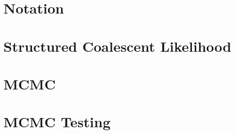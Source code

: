 \documentclass[12pt,a4paper]{article}
\begin{document}
	\section{Notation}
		
	
	\section{Structured Coalescent Likelihood}
		
	
	\section{MCMC}
		
				
	\section{MCMC Testing}
		
					
\end{document}
